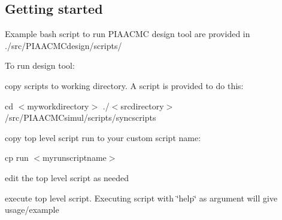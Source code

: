 \subsection*{Getting started}

Example bash script to run P\+I\+A\+A\+C\+M\+C design tool are provided in ./src/\+P\+I\+A\+A\+C\+M\+Cdesign/scripts/

To run design tool\+:
\begin{DoxyItemize}
\item copy scripts to working directory. A script is provided to do this\+:

cd $<$myworkdirectory$>$ ./$<$srcdirectory$>$/src/\+P\+I\+A\+A\+C\+M\+Csimul/scripts/syncscripts
\item copy top level script run to your custom script name\+:

cp run $<$myrunscriptname$>$
\item edit the top level script as needed
\item execute top level script. Executing script with \char`\"{}help\char`\"{} as argument will give usage/example 
\end{DoxyItemize}